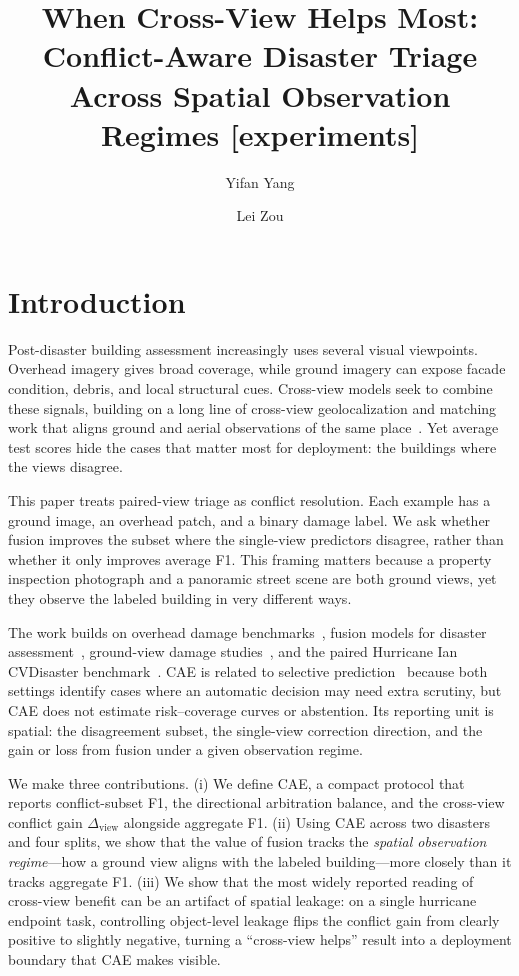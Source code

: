 \documentclass[sigconf]{acmart}
\title{When Cross-View Helps Most: Conflict-Aware Disaster Triage Across Spatial Observation Regimes [experiments]}
\author{Yifan Yang}
\affiliation{%
  \department{Department of Geography}
  \institution{Texas A\&M University}
  \city{College Station}
  \state{Texas}
  \country{USA}
}
\author{Lei Zou}
\affiliation{%
  \department{Department of Geography}
  \institution{Texas A\&M University}
  \city{College Station}
  \state{Texas}
  \country{USA}
}
\newcommand{\dview}{\Delta_{\mathrm{view}}}
\begin{document}
\maketitle

\section{Introduction}
Post-disaster building assessment increasingly uses several visual viewpoints.
Overhead imagery gives broad coverage, while ground imagery can expose facade
condition, debris, and local structural cues. Cross-view models seek to combine
these signals, building on a long line of cross-view geolocalization and
matching work that aligns ground and aerial observations of the same
place~\cite{workman2015wide}. Yet average test scores hide the cases that matter
most for deployment: the buildings where the views disagree.

This paper treats paired-view triage as conflict resolution. Each example has a
ground image, an overhead patch, and a binary damage label. We ask whether
fusion improves the subset where the single-view predictors disagree, rather
than whether it only improves average F1. This framing matters because a
property inspection photograph and a panoramic street scene are both ground
views, yet they observe the labeled building in very different ways.

The work builds on overhead damage benchmarks~\cite{gupta2019creating}, fusion
models for disaster assessment~\cite{xiao2023cross}, ground-view damage
studies~\cite{zhai2020damage,xue2024post,yang2025hyperlocal}, and the paired
Hurricane Ian CVDisaster benchmark~\cite{li2025cross}. CAE is related to
selective prediction~\cite{geifman2017selective} because both settings identify
cases where an automatic decision may need extra scrutiny, but CAE does not
estimate risk--coverage curves or abstention. Its reporting unit is spatial: the
disagreement subset, the single-view correction direction, and the gain or loss
from fusion under a given observation regime.

We make three contributions. (i) We define CAE, a compact protocol that reports
conflict-subset F1, the directional arbitration balance, and the cross-view
conflict gain $\dview$ alongside aggregate F1. (ii) Using CAE across two
disasters and four splits, we show that the value of fusion tracks the
\emph{spatial observation regime}---how a ground view aligns with the labeled
building---more closely than it tracks aggregate F1. (iii) We show that the most
widely reported reading of cross-view benefit can be an artifact of spatial
leakage: on a single hurricane endpoint task, controlling object-level leakage
flips the conflict gain from clearly positive to slightly negative, turning a
``cross-view helps'' result into a deployment boundary that CAE makes visible.
\end{document}
